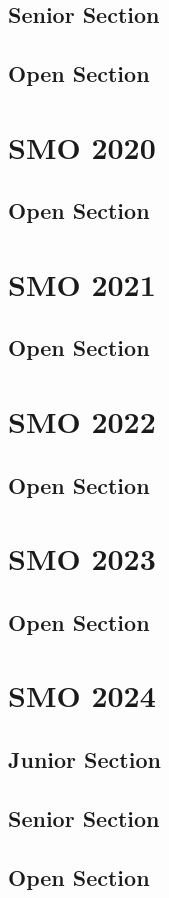 \documentclass[a4paper,listof=totoc,bibliography=totoc,openany]{scrbook}
\begin{document}
\section{Senior Section}



\section{Open Section}




\chapter{SMO 2020}
\section{Open Section}


\chapter{SMO 2021}
\section{Open Section}


\chapter{SMO 2022}
\section{Open Section}



\chapter{SMO 2023}
\section{Open Section}



\chapter{SMO 2024}
\section{Junior Section}


\section{Senior Section}



\section{Open Section}


\end{document}
